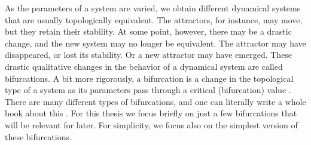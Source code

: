 As the parameters of a system are varied, we obtain different dynamical systems that are usually topologically equivalent. The attractors, for instance, may move, but they retain their stability. At some point, however, there may be a drastic change, and the new system may no longer be equivalent. The attractor may have disappeared, or lost its stability. Or a new attractor may have emerged. These drastic qualitative changes in the behavior of a dynamical system are called bifurcations. A bit more rigorously, a bifurcation is a change in the topological type of a system as its parameters pass through a critical (bifurcation) value \cite{kuznetsov}.
There are many different types of bifurcations, and one can literally write a whole book about this \cite{kuznetsov}. For this thesis we focus briefly on just a few bifurcations that will be relevant for later. For simplicity, we focus also on the simplest version of these bifurcations. 

